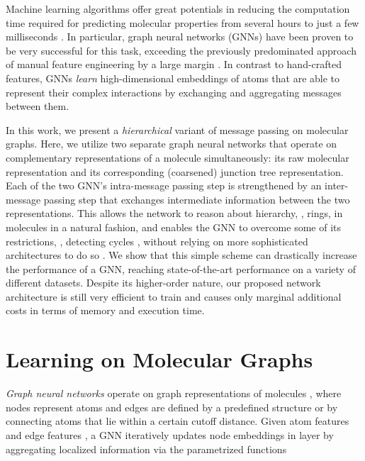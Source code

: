 \documentclass{article}
\begin{document}
Machine learning algorithms offer great potentials in reducing the computation time required for predicting molecular properties from several hours to just a few milliseconds \citep{Wu/etal/2018}.
In particular, graph neural networks (GNNs) have been proven to be very successful for this task, exceeding the previously predominated approach of manual feature engineering by a large margin \citep{Gilmer/etal/2017,Schuett/etal/2017}.
In contrast to hand-crafted features, GNNs \emph{learn} high-dimensional embeddings of atoms that are able to represent their complex interactions by exchanging and aggregating messages between them.

In this work, we present a \emph{hierarchical} variant of message passing on molecular graphs.
Here, we utilize two separate graph neural networks that operate on complementary representations of a molecule simultaneously: its raw molecular representation and its corresponding (coarsened) junction tree representation.
Each of the two GNN's intra-message passing step is strengthened by an inter-message passing step that exchanges intermediate information between the two representations.
This allows the network to reason about hierarchy, \eg, rings, in molecules in a natural fashion, and enables the GNN to overcome some of its restrictions, \eg, detecting cycles \citep{Loukas/2020}, without relying on more sophisticated architectures to do so \citep{Morris/etal/2019,Murphy/etal/2019,Maron/etal/2019}.
We show that this simple scheme can drastically increase the performance of a GNN, reaching state-of-the-art performance on a variety of different datasets.
Despite its higher-order nature, our proposed network architecture is still very efficient to train and causes only marginal additional costs in terms of memory and execution time.



\section{Learning on Molecular Graphs}\label{sec:learning_on_molecular_graphs}

\emph{Graph neural networks} operate on graph representations of molecules , where nodes  represent atoms and edges  are defined by a predefined structure or by connecting atoms that lie within a certain cutoff distance.
Given atom features  and edge features , a GNN iteratively updates node embeddings  in layer  by aggregating localized information via the parametrized functions
\end{document}
